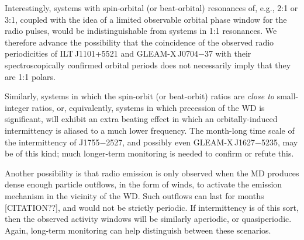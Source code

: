 \documentclass[fleqn,usenatbib]{mnras}
\newcommand{\src}{J1755$-$2527}
\begin{document}
Interestingly, systems with spin-orbital (or beat-orbital) resonances of, e.g., 2:1 or 3:1, coupled with the idea of a limited observable orbital phase window for the radio pulses, would be indistinguishable from systems in 1:1 resonances.
We therefore advance the possibility that the coincidence of the observed radio periodicities of ILT\,J1101+5521 and GLEAM-X\,J0704$-$37 with their spectroscopically confirmed orbital periods does not necessarily imply that they are 1:1 polars.

Similarly, systems in which the spin-orbit (or beat-orbit) ratios are \emph{close to} small-integer ratios, or, equivalently, systems in which precession of the WD is significant, will exhibit an extra beating effect in which an orbitally-induced intermittency is aliased to a much lower frequency.
The month-long time scale of the intermittency of \src{}, and possibly even GLEAM-X\,J1627$-$5235, may be of this kind; much longer-term monitoring is needed to confirm or refute this.

Another possibility is that radio emission is only observed when the MD produces dense enough particle outflows, in the form of winds, to activate the emission mechanism in the vicinity of the WD.
Such outflows can last for months [CITATION??], and would not be strictly periodic.
If intermittency is of this sort, then the observed activity windows will be similarly aperiodic, or quasiperiodic.
Again, long-term monitoring can help distinguish between these scenarios.







\end{document}
